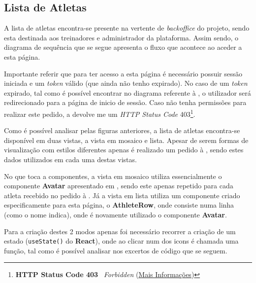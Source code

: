 \subsection{Lista de Atletas}
\label{athletesSequenceDiagram}

A lista de atletas encontra-se presente na vertente de \textit{backoffice} do projeto, sendo esta destinada aos treinadores e administrador da plataforma. Assim sendo, o diagrama de sequência que se segue apresenta o fluxo que acontece ao aceder a esta página.


Importante referir que para ter acesso a esta página é necessário possuir sessão iniciada e um \textit{token} válido (que ainda não tenho expirado). No caso de um \textit{token} expirado, tal como é possível encontrar no diagrama referente à , o utilizador será redirecionado para a página de inicio de sessão. Caso não tenha permissões para realizar este pedido, a \textbf{} devolve me um \textit{HTTP Status Code} 403\footnote{\textbf{HTTP Status Code 403 \textemdash} ~\textit{Forbidden} (\href{https://developer.mozilla.org/pt-BR/docs/Web/HTTP/Status/403}{Mais Informações})}.



Como é possível analisar pelas figuras anteriores, a lista de atletas encontra-se disponível em duas vistas, a vista em mosaico e lista. Apesar de serem formas de visualização com estilos diferentes apenas é realizado um pedido à \textbf{}, sendo estes dados utilizados em cada uma destas vistas.

No que toca a componentes, a vista em mosaico utiliza essencialmente o componente \textbf{Avatar} apresentado em , sendo este apenas repetido para cada atleta recebido no pedido à \textbf{}. Já a vista em lista utiliza um componente criado especificamente para esta página, o \textbf{AthleteRow}, onde consiste numa linha (como o nome indica), onde é novamente utilizado o componente \textbf{Avatar}.

Para a criação destes 2 modos apenas foi necessário recorrer a criação de um estado (\texttt{useState()} do \textbf{React}), onde ao clicar num dos icons é chamada uma função, tal como é possível analisar nos excertos de código que se seguem.


